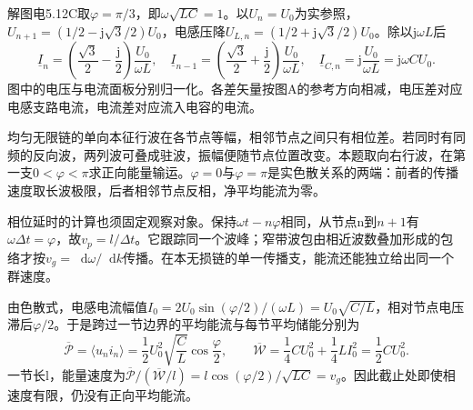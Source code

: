 \documentclass[UTF8,fontset=fandol,a4paper,11pt]{ctexart}
\newcommand{\dd}{\mathop{}\!\mathrm{d}}
\begin{document}
解图电5.12C取$\varphi=\pi/3$，即$\omega\sqrt{LC}=1$。以$U_n=U_0$为实参照，$U_{n+1}=(1/2-\mathrm j\sqrt3/2)U_0$，电感压降$U_{L,n}=(1/2+\mathrm j\sqrt3/2)U_0$。除以$\mathrm j\omega L$后
\[
\underline I_n=\left(\frac{\sqrt3}{2}-\frac{\mathrm j}{2}\right)\frac{U_0}{\omega L},\quad
\underline I_{n-1}=\left(\frac{\sqrt3}{2}+\frac{\mathrm j}{2}\right)\frac{U_0}{\omega L},\quad
\underline I_{C,n}=\mathrm j\frac{U_0}{\omega L}=\mathrm j\omega CU_0.
\]
图中的电压与电流面板分别归一化。各差矢量按图A的参考方向相减，电压差对应电感支路电流，电流差对应流入电容的电流。

均匀无限链的单向本征行波在各节点等幅，相邻节点之间只有相位差。若同时有同频的反向波，两列波可叠成驻波，振幅便随节点位置改变。本题取向右行波，在第一支$0<\varphi<\pi$求正向能量输运。$\varphi=0$与$\varphi=\pi$是实色散关系的两端：前者的传播速度取长波极限，后者相邻节点反相，净平均能流为零。

相位延时的计算也须固定观察对象。保持$\omega t-n\varphi$相同，从节点n到$n+1$有$\omega\Delta t=\varphi$，故$v_p=l/\Delta t$。它跟踪同一个波峰；窄带波包由相近波数叠加形成的包络才按$v_g=\dd\omega/\dd k$传播。在本无损链的单一传播支，能流还能独立给出同一个群速度。

由色散式，电感电流幅值$I_0=2U_0\sin(\varphi/2)/(\omega L)=U_0\sqrt{C/L}$，相对节点电压滞后$\varphi/2$。于是跨过一节边界的平均能流与每节平均储能分别为
\[
\overline{\mathcal P}=\langle u_ni_n\rangle
=\frac12U_0^2\sqrt{\frac CL}\cos\frac\varphi2,\qquad
\overline{\mathcal W}=\frac14CU_0^2+\frac14LI_0^2=\frac12CU_0^2.
\]
一节长l，能量速度为$\overline{\mathcal P}/(\overline{\mathcal W}/l)=l\cos(\varphi/2)/\sqrt{LC}=v_g$。因此截止处即使相速度有限，仍没有正向平均能流。
\end{document}

